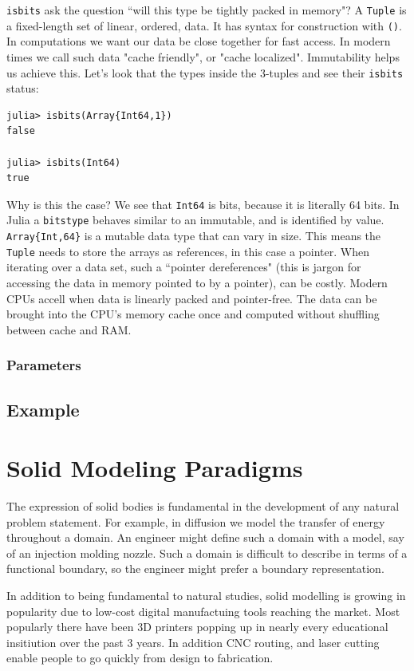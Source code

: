 \documentclass[a4paper]{article}
\begin{document}
\texttt{isbits} ask the question ``will this type be tightly packed in memory"? A
\texttt{Tuple} is a fixed-length set of linear, ordered, data. It has syntax for
construction with \texttt{()}. In computations we want our data be close together
for fast access. In modern times we call such data "cache friendly", or
"cache localized". Immutability helps us achieve this. Let's look that the
types inside the 3-tuples and see their \texttt{isbits} status:
\begin{lstlisting}
julia> isbits(Array{Int64,1})
false

julia> isbits(Int64)
true
\end{lstlisting}
Why is this the case? We see that \texttt{Int64} is bits, because it is literally
64 bits. In Julia a \texttt{bitstype} behaves similar to an immutable, and is identified
by value. \texttt{Array\{Int,64\}} is a mutable data type that can vary in size.
This means
the \texttt{Tuple} needs to store the arrays as references, in this case a
pointer. When iterating over a data set, such a ``pointer dereferences" (this is
jargon for accessing the data in memory pointed to by a pointer), can be costly.
Modern CPUs accell when data is linearly packed and pointer-free. The
data can be brought into the CPU's memory cache once and computed without
shuffling between cache and RAM.

\subsubsection{Parameters}


\subsection{Example}


\section{Solid Modeling Paradigms}

The expression of solid bodies is fundamental in the development of any
natural problem statement. For example, in diffusion we model the transfer of
energy throughout a domain. An engineer might define such a domain with a
model, say of an injection molding nozzle. Such a domain is difficult to
describe in terms of a functional boundary, so the engineer might prefer
a boundary representation.

In addition to being fundamental to natural studies, solid modelling is growing
in popularity due to low-cost digital manufactuing tools reaching the market.
Most popularly there have been 3D printers popping up in nearly every educational
insitiution over the past 3 years. In addition CNC routing, and laser cutting
enable people to go quickly from design to fabrication.
\end{document}
